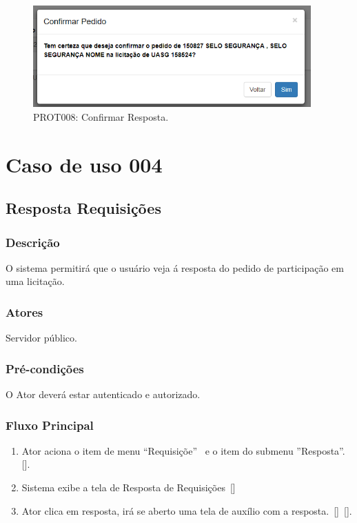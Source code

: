 \begin{anexosenv}
\begin{figure}[htbp]
    \centering
    \includegraphics[width=0.95\textwidth]{figuras/prototipo008.png}
    \caption[PROT008]{PROT008: Confirmar Resposta.}
    \label{PROT008}
\end{figure}

\chapter{Caso de uso 004}\label{CASO004}

\section*{Resposta Requisições}

\subsection*{Descrição}
O sistema permitirá que o usuário veja á resposta do pedido de participação em uma licitação.

\subsection*{Atores}
Servidor público.

\subsection*{Pré-condições}
O Ator deverá estar autenticado e autorizado.

\subsection*{Fluxo Principal}
\begin{enumerate}
    \item Ator aciona o item de menu ``Requisiçõe''~ e o item do submenu ''Resposta''.[].
    \item\label{FP004002} Sistema exibe a tela de Resposta de  Requisições~[]
    \item\label{FP004003} Ator clica em resposta, irá se aberto uma tela de auxílio com a resposta.~[]~[].
\end{enumerate}


\end{anexosenv}
